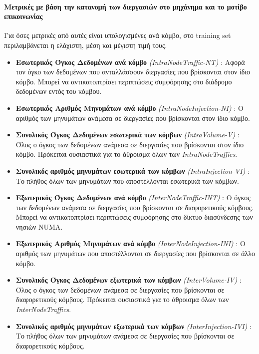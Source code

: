 \paragraph{Μετρικές με βάση την κατανομή των διεργασιών στο μηχάνημα και το μοτίβο επικοινωνίας\\}
Για όσες μετρικές από αυτές είναι υπολογισμένες ανά κόμβο, στο training set περιλαμβάνεται η ελάχιστη, μέση και μέγιστη τιμή τους.
\begin{itemize}
\item \textbf{Εσωτερικός Όγκος Δεδομένων ανά κόμβο} \textit{(IntraΝodeΤraffic-NT)} : Αφορά τον όγκο των δεδομένων που ανταλλάσσουν διεργασίες που βρίσκονται στον ίδιο κόμβο. Μπορεί να αντικατοπτρίσει περιπτώσεις συμφόρησης στο διάδρομο δεδομένων εντός του κόμβου. 
\item \textbf{Εσωτερικός Αριθμός Μηνυμάτων ανά κόμβο} \textit{(IntraΝodeΙnjection-NI)} : Ο αριθμός των μηνυμάτων ανάμεσα σε διεργασίες που βρίσκονται στον ίδιο κόμβο.
\item \textbf{Συνολικός Όγκος Δεδομένων εσωτερικά των κόμβων} \textit{(Int\-raVolume-V)} : Όλος ο όγκος των δεδομένων ανάμεσα σε διεργασίες που βρίσκονται στον ίδιο κόμβο. Πρόκειται ουσιαστικά για το άθροισμα όλων των \textit{IntraNodeTraffics}.
\item \textbf{Συνολικός αριθμός μηνυμάτων εσωτερικά των κόμβων} \textit{(Int\-raInjection-VI)} : Το πλήθος όλων των μηνυμάτων που αποστέλλονται εσωτερικά των κόμβων. 
\item \textbf{Εξωτερικός Όγκος Δεδομένων ανά κόμβο} \textit{(InterNodeTraffic-INT)} : Ο όγκος των δεδομένων ανάμεσα σε διεργασίες που βρίσκονται σε διαφορετικούς κόμβους. Μπορεί να αντικατοπτρίσει περιπτώσεις συμφόρησης στο δίκτυο διασύνδεσης των νησιών NUMA. 
\item \textbf{Εξωτερικός Αριθμός Μηνυμάτων ανά κόμβο} \textit{(InterΝodeΙnjection-INI)} : Ο αριθμός των μηνυμάτων που αποστέλλονται σε διεργασίες που βρίσκονται σε άλλο κόμβο.
\item \textbf{Συνολικός Όγκος Δεδομένων εξωτερικά των κόμβων} \textit{(Int\-erVolume-IV)} : Όλος ο όγκος των δεδομένων ανάμεσα σε διεργασίες που βρίσκονται σε διαφορετικούς κόμβους. Πρόκειται ουσιαστικά για το άθροισμα όλων των \textit{InterNodeTraffics}.
\item \textbf{Συνολικός αριθμός μηνυμάτων εξωτερικά των κόμβων} \textit{(Int\-erInjection-IVI)} : Το πλήθος όλων των μηνυμάτων ανάμεσα σε διεργασίες που βρίσκονται σε διαφορετικούς κόμβους. 
\end{itemize}

